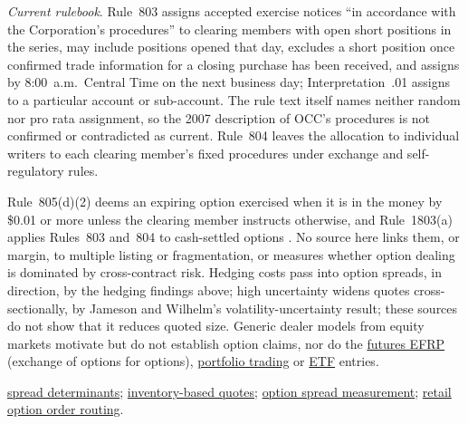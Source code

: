 \begin{qfresult}
\emph{Current rulebook}. Rule~803 assigns accepted exercise notices ``in accordance with the Corporation's procedures'' to clearing members with open short positions in the series, may include positions opened that day, excludes a short position once confirmed trade information for a closing purchase has been received, and assigns by 8:00~a.m.\ Central Time on the next business day; Interpretation~.01 assigns to a particular account or sub-account. The rule text itself names neither random nor pro rata assignment, so the 2007 description of OCC's procedures is not confirmed or contradicted as current. Rule~804 leaves the allocation to individual writers to each clearing member's fixed procedures under exchange and self-regulatory rules.

Rule~805(d)(2) deems an expiring option exercised when it is in the money by \$0.01 or more unless the clearing member instructs otherwise, and Rule~1803(a) applies Rules~803 and~804 to cash-settled options \citep[Rules~803--805, PDF pp.~88--90, printed pp.~60--62; Rule~1803, PDF pp.~169--170]{occ-rules-2025}. No source here links them, or margin, to multiple listing or fragmentation, or measures whether option dealing is dominated by cross-contract risk. Hedging costs pass into option spreads, in direction, by the hedging findings above; high uncertainty widens quotes cross-sectionally, by Jameson and Wilhelm's volatility-uncertainty result; these sources do not show that it reduces quoted size. Generic dealer models from equity markets motivate but do not establish option claims, nor do the \hyperref[conv:futures-block-efrp]{futures EFRP} (exchange of options for options), \hyperref[def:portfolio-trading]{portfolio trading} or \hyperref[mech:etf-creation-redemption]{ETF} entries.

 \hyperref[res:spread-determinants]{spread determinants}; \hyperref[mod:inventory-based-quotes]{inventory-based quotes}; \hyperref[meth:option-spread-measurement]{option spread measurement}; \hyperref[mech:options-retail-wholesaler-routing]{retail option order routing}.

\end{qfresult}

